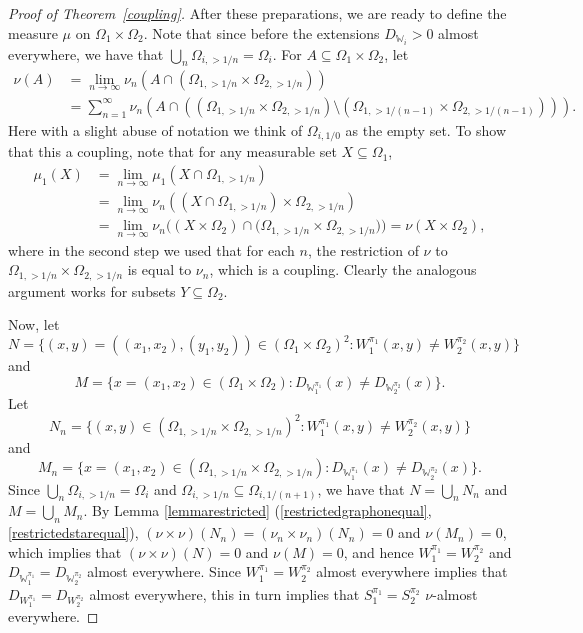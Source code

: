 \documentclass{amsart}
\numberwithin{equation}{section}
\numberwithin{figure}{section}
\theoremstyle{definition}
\theoremstyle{remark}
\newcommand{\cW}{\mathbb{W}}
\begin{document}
\begin{proof}[Proof of Theorem~\ref{coupling}]
{After these preparations, we are ready to} define the measure $\mu$ on
$\Omega_1 \times \Omega_2$. Note that since before the extensions
$D_{\cW_i}>0$ almost everywhere, we have that
$\bigcup_{n}\Omega_{i,>1/n}=\Omega_i$. For $A \subseteq \Omega_1 \times
\Omega_2$, let
\[
\begin{split}
\nu(A)&=\lim_{n \rightarrow \infty} \nu_n(A \cap (\Omega_{1,>1/n} \times
\Omega_{2,>1/n}))\\
&=\sum_{n=1}^\infty \nu_n(A \cap ((\Omega_{1,>1/n} \times
\Omega_{2,>1/n}) \setminus (\Omega_{1,>1/(n-1)} \times \Omega_{2,>1/(n-1)}))).
\end{split}
\]
Here with a slight abuse of notation we think of $\Omega_{i,1/0}$ as the
empty set. To show that this a coupling, note that for any measurable set $X
\subseteq \Omega_1$,
\[
\begin{split}
\mu_1(X) &= \lim_{n \rightarrow \infty} \mu_1(X \cap \Omega_{1,>1/n})\\
&=\lim_{n \rightarrow \infty} \nu_n((X \cap \Omega_{1,>1/n}) \times \Omega_{2,>1/n})\\
&=
\lim_{n \rightarrow \infty} \nu_n((X \times \Omega_2) \cap (\Omega_{1,>1/n} \times \Omega_{2,>1/n}{))}
=\nu(X \times \Omega_2),
\end{split}
\]
where in the second step we used that for each $n$, the restriction of $\nu$
to $\Omega_{1,>1/n} \times \Omega_{2,>1/n}$ is equal to $\nu_n$, which is a
coupling. Clearly the analogous argument works for subsets
$Y\subseteq\Omega_2$.

Now, let
\[
N=\{(x,y)=((x_1,x_2),(y_1,y_2)) \in (\Omega_1 \times \Omega_2)^2:W_1^{\pi_1}(x,y) \neq W_2^{\pi_2}(x,y)\}
\]
and
\[
M=\{x=(x_1,x_2)\in (\Omega_1 \times \Omega_2):
D_{\cW_1^{\pi_1}}(x)\neq D_{\cW_2^{\pi_2}}(x)
\}
.
\]
Let
\[N_n=\{(x,y) \in (\Omega_{1,>1/n} \times \Omega_{2,>1/n})^2:W_1^{\pi_1}(x,y) \neq W_2^{\pi_2}(x,y)\}
\]
and
\[
M_n=\{x=(x_1,x_2)\in (\Omega_{1,>1/n} \times \Omega_{2,>1/n}):
D_{\cW_1^{\pi_1}}(x)\neq D_{\cW_2^{\pi_2}}(x)
\}
.
\]
Since ${\bigcup_n}\Omega_{i,>1/n}=\Omega_i$ and $\Omega_{i,>1/n}\subseteq
\Omega_{i,1/(n+1)}$, we have that $N=\bigcup_n N_n$ and $M=\bigcup_n M_n$. By
Lemma \ref{lemmarestricted}
(\ref{restrictedgraphonequal},\ref{restrictedstarequal}), $(\nu \times
\nu)(N_n)=(\nu_n \times \nu_n) (N_n) = 0$ and $\nu(M_n)=0$, which implies
that $(\nu \times \nu)(N)=0$ and $\nu(M)=0$, and hence
$W_1^{\pi_1}=W_2^{\pi_2}$ and $D_{\cW_1^{\pi_1}}= D_{\cW_2^{\pi_2}}$ almost
everywhere. Since $W_1^{\pi_1}=W_2^{\pi_2}$ almost everywhere implies that
$D_{W_1^{\pi_1}}= D_{W_2^{\pi_2}}$ almost everywhere, this in turn implies
that $S_1^{\pi_1}=S_2^{\pi_2}$ $\nu$-almost everywhere.


\end{proof}
\end{document}
